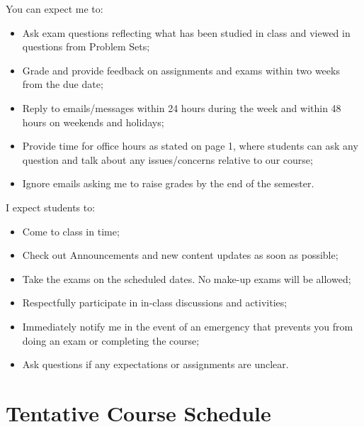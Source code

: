 \documentclass[11pt,]{article}
\begin{document}
You can expect me to:

\begin{itemize}
\item
  Ask exam questions reflecting what has been studied in class and
  viewed in questions from Problem Sets;
\item
  Grade and provide feedback on assignments and exams within two weeks
  from the due date;
\item
  Reply to emails/messages within 24 hours during the week and within 48
  hours on weekends and holidays;
\item
  Provide time for office hours as stated on page 1, where students can
  ask any question and talk about any issues/concerns relative to our
  course;
\item
  Ignore emails asking me to raise grades by the end of the semester.
\end{itemize}

I expect students to:

\begin{itemize}
\item
  Come to class in time;
\item
  Check out Announcements and new content updates as soon as possible;
\item
  Take the exams on the scheduled dates. No make-up exams will be
  allowed;
\item
  Respectfully participate in in-class discussions and activities;
\item
  Immediately notify me in the event of an emergency that prevents you
  from doing an exam or completing the course;
\item
  Ask questions if any expectations or assignments are unclear.
\end{itemize}

\hypertarget{tentative-course-schedule}{%
\section{Tentative Course Schedule}\label{tentative-course-schedule}}

\vspace{.3cm}
\end{document}
